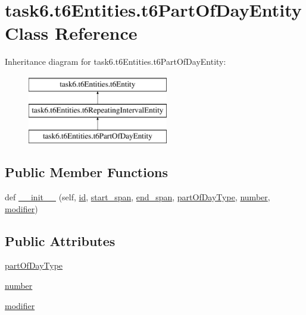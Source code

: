 \hypertarget{classtask6_1_1t6Entities_1_1t6PartOfDayEntity}{}\section{task6.\+t6\+Entities.\+t6\+Part\+Of\+Day\+Entity Class Reference}
\label{classtask6_1_1t6Entities_1_1t6PartOfDayEntity}
Inheritance diagram for task6.\+t6\+Entities.\+t6\+Part\+Of\+Day\+Entity\+:\begin{figure}[H]
\begin{center}
\leavevmode
\includegraphics[height=3.000000cm]{classtask6_1_1t6Entities_1_1t6PartOfDayEntity}
\end{center}
\end{figure}
\subsection*{Public Member Functions}
\begin{DoxyCompactItemize}
\item 
def \hyperlink{classtask6_1_1t6Entities_1_1t6PartOfDayEntity_a4b361cb19774c11909028f6727c27b24}{\+\_\+\+\_\+init\+\_\+\+\_\+} (self, \hyperlink{classtask6_1_1t6Entities_1_1t6Entity_a96b2e7fb553c920ab2db6f6deb31e3b4}{id}, \hyperlink{classtask6_1_1t6Entities_1_1t6Entity_a8221c36d2995a24200cdfbd74cc9233c}{start\+\_\+span}, \hyperlink{classtask6_1_1t6Entities_1_1t6Entity_a597d42bb02fc9f42277098f0ce21917c}{end\+\_\+span}, \hyperlink{classtask6_1_1t6Entities_1_1t6PartOfDayEntity_ae4569d726efa6371cd707dd42509e376}{part\+Of\+Day\+Type}, \hyperlink{classtask6_1_1t6Entities_1_1t6PartOfDayEntity_aa70066ae490ef8e482322cb6c93ba20a}{number}, \hyperlink{classtask6_1_1t6Entities_1_1t6PartOfDayEntity_a22af3bbfe52a84f65e0aa37c89389e71}{modifier})
\end{DoxyCompactItemize}
\subsection*{Public Attributes}
\begin{DoxyCompactItemize}
\item 
\hyperlink{classtask6_1_1t6Entities_1_1t6PartOfDayEntity_ae4569d726efa6371cd707dd42509e376}{part\+Of\+Day\+Type}
\item 
\hyperlink{classtask6_1_1t6Entities_1_1t6PartOfDayEntity_aa70066ae490ef8e482322cb6c93ba20a}{number}
\item 
\hyperlink{classtask6_1_1t6Entities_1_1t6PartOfDayEntity_a22af3bbfe52a84f65e0aa37c89389e71}{modifier}
\end{DoxyCompactItemize}


